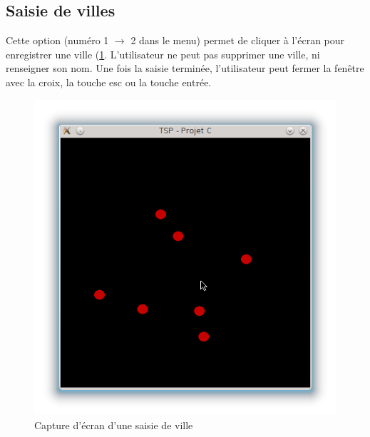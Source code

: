 \documentclass[a4paper,11pt]{article}
\begin{document}
\subsection{Saisie de villes}
Cette option (numéro 1 $\rightarrow$ 2 dans le menu) permet de cliquer à l'écran pour enregistrer une ville (\ref{fig2}. L'utilisateur ne peut pas supprimer une ville, ni renseigner son nom. Une fois la saisie terminée, l'utilisateur peut fermer la fenêtre avec la croix, la touche esc ou la touche entrée.
\begin{center}
\begin{figure}[htbp]
\begin{center}
\includegraphics[scale=0.3]{saisie.png}
\caption{Capture d'écran d'une saisie de ville}
\label{fig2}
\end{center}
\end{figure}
\end{center}
\end{document}
